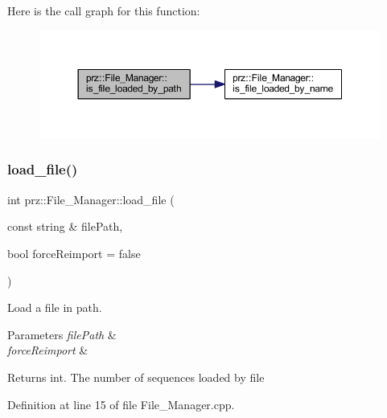 Here is the call graph for this function\+:
\nopagebreak
\begin{figure}[H]
\begin{center}
\leavevmode
\includegraphics[width=350pt]{classprz_1_1_file___manager_ab1b6f6447621351af16262236dad73b3_cgraph}
\end{center}
\end{figure}
\mbox{\label{classprz_1_1_file___manager_aad862a71b68f6bb1870b1750f33e70f4}} 
\subsubsection{\texorpdfstring{load\_file()}{load\_file()}}
{\footnotesize\ttfamily int prz\+::\+File\+\_\+\+Manager\+::load\+\_\+file (\begin{DoxyParamCaption}\item[{const string \&}]{file\+Path,  }\item[{bool}]{force\+Reimport = {\ttfamily false} }\end{DoxyParamCaption})}



Load a file in path. 


\begin{DoxyParams}{Parameters}
{\em file\+Path} & \\
\hline
{\em force\+Reimport} & \\
\hline
\end{DoxyParams}
\begin{DoxyReturn}{Returns}
int. The number of sequences loaded by file 
\end{DoxyReturn}


Definition at line 15 of file File\+\_\+\+Manager.\+cpp.

